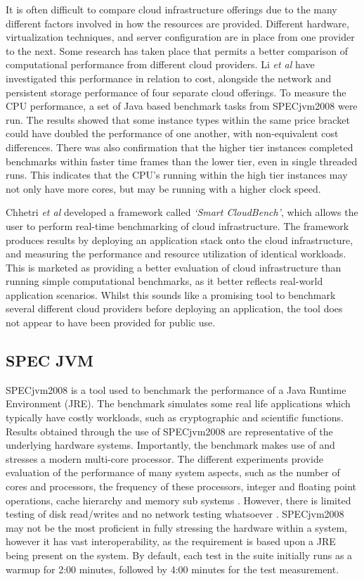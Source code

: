 \documentclass{llncs}
\begin{document}
It is often difficult to compare cloud infrastructure offerings due to the many different factors involved in how the resources are provided. Different hardware, virtualization techniques, and server configuration are in place from one provider to the next\cite{chhetri2013smart}. Some research has taken place that permits a better comparison of computational performance from different cloud providers. Li \textit{et al}\cite{li2010cloudcmp} have investigated this performance in relation to cost, alongside the network and persistent storage performance of four separate cloud offerings. To measure the CPU performance, a set of Java based benchmark tasks from SPECjvm2008 were run. The results showed that some instance types within the same price bracket could have doubled the performance of one another, with non-equivalent cost differences. There was also confirmation that the higher tier instances completed benchmarks within faster time frames than the lower tier, even in single threaded runs. This indicates that the CPU's running within the high tier instances may not only have more cores, but may be running with a higher clock speed.

Chhetri \textit{et al}\cite{chhetri2013smart} developed a framework called \textit{`Smart CloudBench'}, which allows the user to perform real-time benchmarking of cloud infrastructure. The framework produces results by deploying an application stack onto the cloud infrastructure, and measuring the performance and resource utilization of identical workloads. This is marketed as providing a better evaluation of cloud infrastructure than running simple computational benchmarks, as it better reflects real-world application scenarios. Whilst this sounds like a promising tool to benchmark several different cloud providers before deploying an application, the tool does not appear to have been provided for public use.

\subsection{SPEC JVM}

SPECjvm2008 is a tool used to benchmark the performance of a Java Runtime Environment (JRE). The benchmark simulates some real life applications which typically have costly workloads, such as cryptographic and scientific functions. Results obtained through the use of SPECjvm2008 are representative of the underlying hardware systems. Importantly, the benchmark makes use of and stresses a modern multi-core processor. The different experiments provide evaluation of the performance of many system aspects, such as the number of cores and processors, the frequency of these processors, integer and floating point operations, cache hierarchy and memory sub systems \cite{shiv2009specjvm2008}. However, there is limited testing of disk read/writes and no network testing whatsoever \cite{specjvm}. SPECjvm2008 may not be the most proficient in fully stressing the hardware within a system, however it has vast interoperability, as the requirement is based upon a JRE being present on the system. By default, each test in the suite initially runs as a warmup for 2:00 minutes, followed by 4:00 minutes for the test measurement.
\end{document}
